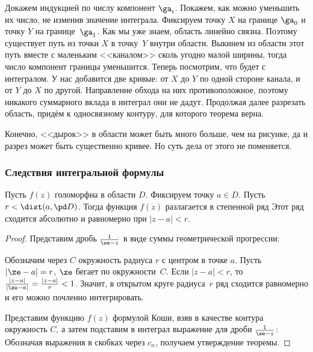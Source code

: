 \documentclass[a4paper]{article}
\begin{document}
Докажем индукцией по числу компонент $\ga_i$. Покажем, как можно уменьшить
их число, не изменив значение интеграла. Фиксируем точку $X$ на границе $\ga_0$ и точку $Y$ на границе~$\ga_1$.
Как мы уже знаем, область линейно связна. Поэтому существует путь из точки $X$ в точку~$Y$ внутри области.
Выкинем из области этот путь вместе с маленьким <<каналом>> сколь угодно малой ширины, тогда число компонент
границы уменьшится. Теперь посмотрим, что будет с интегралом. У нас добавится две кривые: от $X$ до $Y$ по одной
стороне канала, и от $Y$ до $X$ по другой. Направление обхода на них противоположное, поэтому никакого суммарного вклада
в интеграл они не дадут. Продолжая далее разрезать область, придём к односвязному контуру, для которого теорема верна.

\begin{note}
Конечно, <<дырок>> в области может быть много больше, чем на рисунке, да и разрез может быть существенно кривее.
Но суть дела от этого не поменяется.
\end{note}


\subsubsection{Следствия интегральной формулы}

\begin{theorem}
Пусть $f(z)$ голоморфна в области $D$. Фиксируем точку $a \in D$. Пусть $r < \dist(a, \pd D)$.
Тогда функция $f(z)$ разлагается в степенной ряд
Этот ряд сходится абсолютно и равномерно при $|z-a| < r$.
\end{theorem}
\begin{proof}
Представим дробь $\frac{1}{\ze-z}$ в виде суммы геометрической прогрессии:

Обозначим через $C$ окружность радиуса $r$ с центром в точке $a$.
Пусть $|\ze-a|=r$,  $\ze$ бегает по окружности~$C$. Если $|z-a| < r$, то
$\frac{|z-a|}{|\ze-a|}  = \frac{|z-a|}{r} < 1$. Значит, в открытом круге радиуса~$r$
ряд сходится равномерно и его можно почленно интегрировать.

Представим функцию $f(z)$ формулой Коши, взяв в качестве контура окружность $C$, а затем подставим в интеграл
выражение для дроби $\frac{1}{\ze-z}$:
Обозначая выражения в скобках через $c_n$, получаем утверждение теоремы.
\end{proof}
\end{document}
